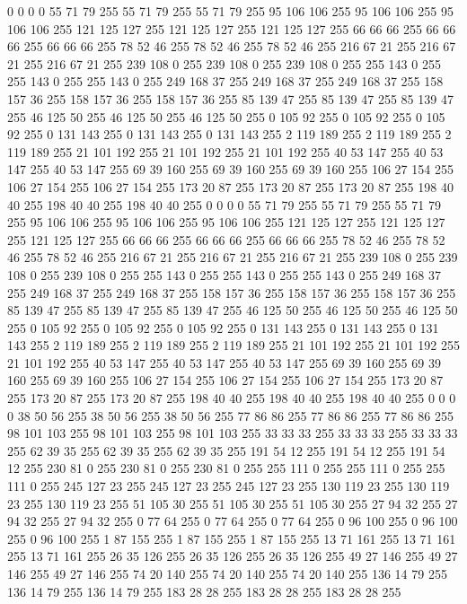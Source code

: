 0 0 0 0 55 71 79 255 55 71 79 255 55 71 79 255 95 106 106 255 95 106 106 255 95 106 106 255 121 125 127 255 121 125 127 255 121 125 127 255 66 66 66 255 66 66 66 255 66 66 66 255 78 52 46 255 78 52 46 255 78 52 46 255
216 67 21 255 216 67 21 255 216 67 21 255 239 108 0 255 239 108 0 255 239 108 0 255 255 143 0 255 255 143 0 255 255 143 0 255 249 168 37 255 249 168 37 255 249 168 37 255 158 157 36 255 158 157 36 255 158 157 36 255 85 139 47 255
85 139 47 255 85 139 47 255 46 125 50 255 46 125 50 255 46 125 50 255 0 105 92 255 0 105 92 255 0 105 92 255 0 131 143 255 0 131 143 255 0 131 143 255 2 119 189 255 2 119 189 255 2 119 189 255 21 101 192 255 21 101 192 255
21 101 192 255 40 53 147 255 40 53 147 255 40 53 147 255 69 39 160 255 69 39 160 255 69 39 160 255 106 27 154 255 106 27 154 255 106 27 154 255 173 20 87 255 173 20 87 255 173 20 87 255 198 40 40 255 198 40 40 255 198 40 40 255
0 0 0 0 55 71 79 255 55 71 79 255 55 71 79 255 95 106 106 255 95 106 106 255 95 106 106 255 121 125 127 255 121 125 127 255 121 125 127 255 66 66 66 255 66 66 66 255 66 66 66 255 78 52 46 255 78 52 46 255 78 52 46 255
216 67 21 255 216 67 21 255 216 67 21 255 239 108 0 255 239 108 0 255 239 108 0 255 255 143 0 255 255 143 0 255 255 143 0 255 249 168 37 255 249 168 37 255 249 168 37 255 158 157 36 255 158 157 36 255 158 157 36 255 85 139 47 255
85 139 47 255 85 139 47 255 46 125 50 255 46 125 50 255 46 125 50 255 0 105 92 255 0 105 92 255 0 105 92 255 0 131 143 255 0 131 143 255 0 131 143 255 2 119 189 255 2 119 189 255 2 119 189 255 21 101 192 255 21 101 192 255
21 101 192 255 40 53 147 255 40 53 147 255 40 53 147 255 69 39 160 255 69 39 160 255 69 39 160 255 106 27 154 255 106 27 154 255 106 27 154 255 173 20 87 255 173 20 87 255 173 20 87 255 198 40 40 255 198 40 40 255 198 40 40 255
0 0 0 0 38 50 56 255 38 50 56 255 38 50 56 255 77 86 86 255 77 86 86 255 77 86 86 255 98 101 103 255 98 101 103 255 98 101 103 255 33 33 33 255 33 33 33 255 33 33 33 255 62 39 35 255 62 39 35 255 62 39 35 255
191 54 12 255 191 54 12 255 191 54 12 255 230 81 0 255 230 81 0 255 230 81 0 255 255 111 0 255 255 111 0 255 255 111 0 255 245 127 23 255 245 127 23 255 245 127 23 255 130 119 23 255 130 119 23 255 130 119 23 255 51 105 30 255
51 105 30 255 51 105 30 255 27 94 32 255 27 94 32 255 27 94 32 255 0 77 64 255 0 77 64 255 0 77 64 255 0 96 100 255 0 96 100 255 0 96 100 255 1 87 155 255 1 87 155 255 1 87 155 255 13 71 161 255 13 71 161 255
13 71 161 255 26 35 126 255 26 35 126 255 26 35 126 255 49 27 146 255 49 27 146 255 49 27 146 255 74 20 140 255 74 20 140 255 74 20 140 255 136 14 79 255 136 14 79 255 136 14 79 255 183 28 28 255 183 28 28 255 183 28 28 255
